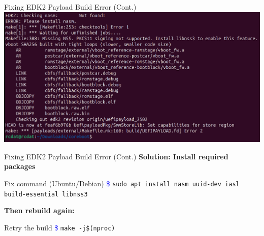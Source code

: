\documentclass{beamer}
\begin{document}
	
	
	
	\begin{frame}{Fixing EDK2 Payload Build Error (Cont.)}
		\centering
		\includegraphics[width=1\linewidth]{images/img6}
	\end{frame}
	
	
	
	\begin{frame}{Fixing EDK2 Payload Build Error (Cont.)}
		\vspace{0.3cm}
		\textbf{Solution: Install required packages}
		
		\begin{exampleblock}{Fix command (Ubuntu/Debian)}
			\textcolor{blue}{\$} \texttt{sudo apt install nasm uuid-dev iasl build-essential libnss3}
		\end{exampleblock}
		
		\textbf{Then rebuild again:}
		
		\begin{exampleblock}{Retry the build}
			\textcolor{blue}{\$} \texttt{make -j\$(nproc)}
		\end{exampleblock}
	\end{frame}
	
	
	
	
	
\end{document}
